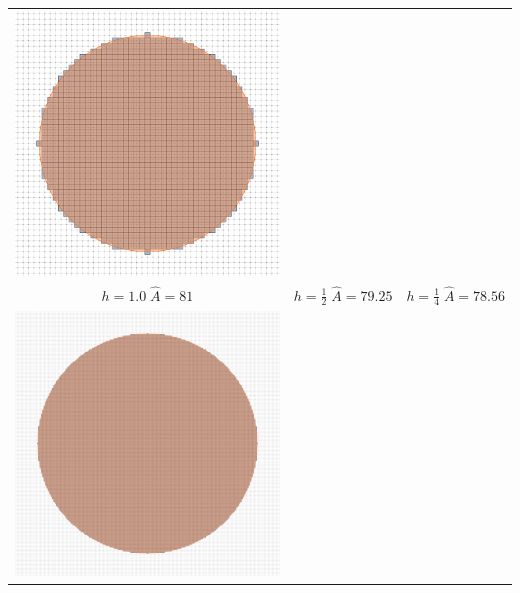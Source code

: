\begin{frame}
\begin{tabular}{ccc}
\includegraphics[scale=0.2]{figures/motivation/digital-geometric-estimators/multigrid/h025.png} \\
$h=1.0\; \widehat{A}=81$ & $h=\frac{1}{2}\; \hat{A}=79.25$ & $h=\frac{1}{4}\; \hat{A}=78.56$\\[1em]
\includegraphics[scale=0.2]{figures/motivation/digital-geometric-estimators/multigrid/h00625.png} &

\end{tabular}
\end{frame}
